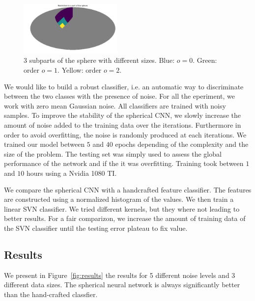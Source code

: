 \documentclass[final,twocolumn,3p,times,authoryear]{elsarticle}
\newcommand{\todo}[1]{{\color[rgb]{.6,.1,.6}{#1}}}
\newcommand{\assign}[1]{{\color[rgb]{.8,.5,.8}{Assigned: #1 }}}
\newcommand{\1}{\b{1}}              %
\newcommand{\0}{\b{0}}              %
\begin{document}
\begin{figure}[!ht]
\centering
\includegraphics[width=0.45\textwidth]{figures/part_sphere.pdf}
\caption{3 subparts of the sphere with different sizes. Blue: $o=0$. Green: order $o=1$. Yellow: order $o=2$.}
\label{fig:subpart_sphere}
\end{figure}

We would like to build a robust classifier, i.e. an automatic way to
discriminate between the two classes with the presence of noise. For all the
eperiment, we work with zero mean Gaussian noise. \todo{Tomek: could you put a
justification.} All classifiers are trained with noisy samples. To improve the
stability of the spherical CNN, we slowly increase the amount of noise added to
the training data over the iterations. Furthermore in order to avoid
overfitting, the noise is randomly produced at each iterations. We trained our
model between $5$ and $40$ epochs depending of the complexity and the size of
the problem. The testing set was simply used to assess the global performance of
the network and if the it was overfitting. 
Training took between $1$ and $10$ hours using a Nvidia 1080 TI.

We compare the spherical CNN with a handcrafted feature classifier. \cite{...}
\todo{Tomek: we need probably 1 or two other classifiers.} The features are
constructed using a normalized histogram of the values. We then train a linear
SVN classifier. We tried different kernels, but they where not leading to better
results. For a fair comparizon, we increase the amount of training data of the
SVN classifier until the testing error plateau to fix value.

\subsection{Results}
\assign{Nathanaël, Tomek}

We present in Figure~\ref{fig:results} the results for 5 different noise levels and $3$ different data sizes. The spherical neural network is always significantly better than the hand-crafted classfier.
\end{document}
